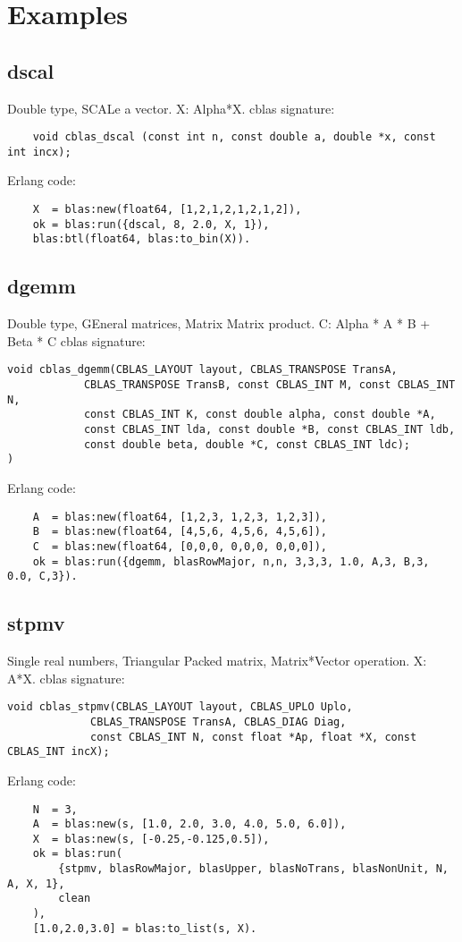 \documentclass{article}
\begin{document}
\newpage
\section{Examples}
\subsection{dscal}
Double type, SCALe a vector.\newline
X: Alpha*X.\newline
cblas signature:
\begin{verbatim}
    void cblas_dscal (const int n, const double a, double *x, const int incx);
\end{verbatim}
Erlang code:
\begin{verbatim}
    X  = blas:new(float64, [1,2,1,2,1,2,1,2]),
    ok = blas:run({dscal, 8, 2.0, X, 1}),
    blas:btl(float64, blas:to_bin(X)).
\end{verbatim}

\subsection{dgemm}
Double type, GEneral matrices, Matrix Matrix product.\newline
C: Alpha * A * B + Beta * C\newline
cblas signature:
\begin{verbatim}
void cblas_dgemm(CBLAS_LAYOUT layout, CBLAS_TRANSPOSE TransA,
            CBLAS_TRANSPOSE TransB, const CBLAS_INT M, const CBLAS_INT N,
            const CBLAS_INT K, const double alpha, const double *A,
            const CBLAS_INT lda, const double *B, const CBLAS_INT ldb,
            const double beta, double *C, const CBLAS_INT ldc);
)	
\end{verbatim}

Erlang code:
\begin{verbatim}
    A  = blas:new(float64, [1,2,3, 1,2,3, 1,2,3]),
    B  = blas:new(float64, [4,5,6, 4,5,6, 4,5,6]),
    C  = blas:new(float64, [0,0,0, 0,0,0, 0,0,0]),
    ok = blas:run({dgemm, blasRowMajor, n,n, 3,3,3, 1.0, A,3, B,3, 0.0, C,3}). 
\end{verbatim}

\subsection{stpmv}
Single real numbers, Triangular Packed matrix, Matrix*Vector operation.\newline
X: A*X.\newline
cblas signature:
\begin{verbatim}
void cblas_stpmv(CBLAS_LAYOUT layout, CBLAS_UPLO Uplo,
             CBLAS_TRANSPOSE TransA, CBLAS_DIAG Diag,
             const CBLAS_INT N, const float *Ap, float *X, const CBLAS_INT incX);
\end{verbatim}
Erlang code:
\begin{verbatim}
    N  = 3,
    A  = blas:new(s, [1.0, 2.0, 3.0, 4.0, 5.0, 6.0]),
    X  = blas:new(s, [-0.25,-0.125,0.5]),
    ok = blas:run(
        {stpmv, blasRowMajor, blasUpper, blasNoTrans, blasNonUnit, N, A, X, 1},
        clean
    ),
    [1.0,2.0,3.0] = blas:to_list(s, X).
\end{verbatim}
\end{document}
